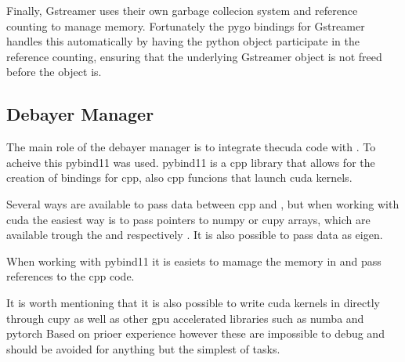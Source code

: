Finally, Gstreamer uses their own garbage collecion system and reference counting to manage memory.
Fortunately the \gls{pygo} bindings for Gstreamer handles this automatically by having the python object participate in the reference counting, ensuring that the underlying Gstreamer object is not freed before the \py object is.


\subsection{Debayer Manager}
The main role of the debayer manager is to integrate the\gls{cuda} code with \py.
To acheive this \gls{pybind11} was used.
\gls{pybind11} is a \gls{cpp} library that allows for the creation of \py bindings for \gls{cpp}, also \gls{cpp} funcions that launch \gls{cuda} kernels.

Several ways are available to pass data between \gls{cpp} and \py, but when working with \gls{cuda} the easiest way is to pass pointers to \gls{numpy} or \gls{cupy} arrays, which are available trough the  and  respectively \cite{numpyArrayInterfaceProtocol} \cite{cupyInteroperabilityCuPy12}.
It is also possible to pass data as \gls{eigen}.

When working with \gls{pybind11} it is easiets to mamage the memory in \py and pass references to the \gls{cpp} code.

It is worth mentioning that it is also possible to write \gls{cuda} kernels in \py directly through \gls{cupy} as well as other \gls{gpu} accelerated libraries such as \gls{numba} and \gls{pytorch}
Based on prioer experience however these are impossible to debug and should be avoided for anything but the simplest of tasks.